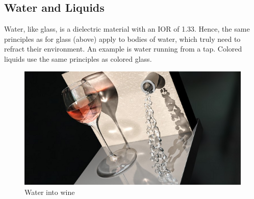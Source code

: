 \documentclass[10pt,a4paper]{article}
\begin{document}
\subsection{Water and Liquids}
Water, like glass, is a dielectric material with an IOR of 1.33. Hence, the same principles as for glass (above) apply to bodies of water, which truly need to refract their environment. An example is water running from a tap. Colored liquids use the same principles as colored glass.

\begin{figure}[tbh]
	\centering
	\includegraphics[width=0.5\linewidth]{"figure/Water into wine"}
	\caption{Water into wine}
	\label{fig:water-into-wine}
\end{figure}
\end{document}
